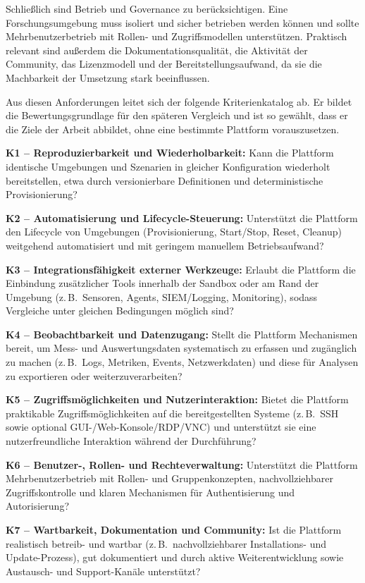 Schließlich sind Betrieb und Governance zu berücksichtigen. Eine Forschungsumgebung muss isoliert
und sicher betrieben werden können und sollte Mehrbenutzerbetrieb mit Rollen- und Zugriffsmodellen
unterstützen. Praktisch relevant sind außerdem die Dokumentationsqualität, die Aktivität der
Community, das Lizenzmodell und der Bereitstellungsaufwand, da sie die Machbarkeit der Umsetzung
stark beeinflussen.

Aus diesen Anforderungen leitet sich der folgende Kriterienkatalog ab. Er bildet die
Bewertungsgrundlage für den späteren Vergleich und ist so gewählt, dass er die Ziele der Arbeit
abbildet, ohne eine bestimmte Plattform vorauszusetzen.

\textbf{K1 -- Reproduzierbarkeit und Wiederholbarkeit:}
Kann die Plattform identische Umgebungen und Szenarien in gleicher Konfiguration wiederholt
bereitstellen, etwa durch versionierbare Definitionen und deterministische Provisionierung?

\textbf{K2 -- Automatisierung und Lifecycle-Steuerung:}
Unterstützt die Plattform den Lifecycle von Umgebungen (Provisionierung, Start/Stop, Reset, Cleanup)
weitgehend automatisiert und mit geringem manuellem Betriebsaufwand?

\textbf{K3 -- Integrationsfähigkeit externer Werkzeuge:}
Erlaubt die Plattform die Einbindung zusätzlicher Tools innerhalb der Sandbox oder am Rand der
Umgebung (z.\,B.\ Sensoren, Agents, SIEM/Logging, Monitoring), sodass Vergleiche unter gleichen
Bedingungen möglich sind?

\textbf{K4 -- Beobachtbarkeit und Datenzugang:}
Stellt die Plattform Mechanismen bereit, um Mess- und Auswertungsdaten systematisch zu erfassen und
zugänglich zu machen (z.\,B.\ Logs, Metriken, Events, Netzwerkdaten) und diese für Analysen zu
exportieren oder weiterzuverarbeiten?

\textbf{K5 -- Zugriffsmöglichkeiten und Nutzerinteraktion:}
Bietet die Plattform praktikable Zugriffsmöglichkeiten auf die bereitgestellten Systeme (z.\,B.\ SSH
sowie optional GUI-/Web-Konsole/RDP/VNC) und unterstützt sie eine nutzerfreundliche Interaktion
während der Durchführung?

\textbf{K6 -- Benutzer-, Rollen- und Rechteverwaltung:}
Unterstützt die Plattform Mehrbenutzerbetrieb mit Rollen- und Gruppenkonzepten, nachvollziehbarer
Zugriffskontrolle und klaren Mechanismen für Authentisierung und Autorisierung?

\textbf{K7 -- Wartbarkeit, Dokumentation und Community:}
Ist die Plattform realistisch betreib- und wartbar (z.\,B.\ nachvollziehbarer Installations- und
Update-Prozess), gut dokumentiert und durch aktive Weiterentwicklung sowie Austausch- und
Support-Kanäle unterstützt?

